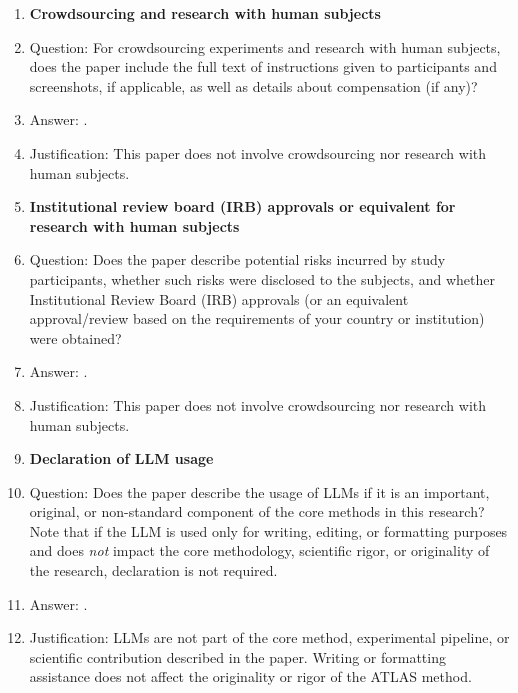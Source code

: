 \begin{enumerate}
\item {\bf Crowdsourcing and research with human subjects}
    \item[] Question: For crowdsourcing experiments and research with human subjects, does the paper include the full text of instructions given to participants and screenshots, if applicable, as well as details about compensation (if any)?
    \item[] Answer: \answerNA{}.
    \item[] Justification: This paper does not involve crowdsourcing nor research with human subjects.

\item {\bf Institutional review board (IRB) approvals or equivalent for research with human subjects}
    \item[] Question: Does the paper describe potential risks incurred by study participants, whether such risks were disclosed to the subjects, and whether Institutional Review Board (IRB) approvals (or an equivalent approval/review based on the requirements of your country or institution) were obtained?
    \item[] Answer: \answerNA{}.
    \item[] Justification: This paper does not involve crowdsourcing nor research with human subjects.

\item {\bf Declaration of LLM usage}
    \item[] Question: Does the paper describe the usage of LLMs if it is an important, original, or non-standard component of the core methods in this research? Note that if the LLM is used only for writing, editing, or formatting purposes and does \emph{not} impact the core methodology, scientific rigor, or originality of the research, declaration is not required.
    \item[] Answer: \answerNA{}.
    \item[] Justification: LLMs are not part of the core method, experimental pipeline, or scientific contribution described in the paper. Writing or formatting assistance does not affect the originality or rigor of the ATLAS method.

\end{enumerate}
